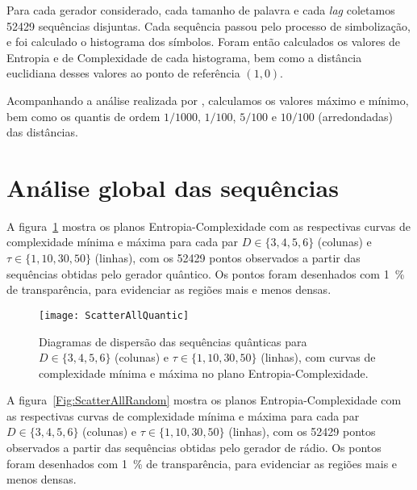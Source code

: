 

\begin{center}
\end{center}

Para cada gerador considerado, cada tamanho de palavra e cada \textit{lag} coletamos \num{52429} sequências disjuntas.
Cada sequência passou pelo processo de simbolização, e foi calculado o histograma dos símbolos.
Foram então calculados os valores de Entropia e de Complexidade de cada histograma, bem como a distância euclidiana desses valores ao ponto de referência $(1,0)$.

Acompanhando a análise realizada por \citet{NewPermutationEntropy}, calculamos os valores máximo e mínimo, bem como os quantis de ordem $1/1000$, $1/100$, $5/100$ e $10/100$ (arredondadas) das distâncias.

\section{Análise global das sequências}

A figura~\ref{Fig:ScatterAllQuantic} mostra os planos Entropia-Complexidade com as respectivas curvas de complexidade mínima e máxima para cada par $D\in\{3,4,5,6\}$ (colunas) e $\tau\in\{1,10,30,50\}$ (linhas), com os \num{52429} pontos observados a partir das sequências obtidas pelo gerador quântico.
Os pontos foram desenhados com \SI{1}{\percent} de transparência, para evidenciar as regiões mais e menos densas.

\begin{figure}[hbt]
\centering
\texttt{[image: ScatterAllQuantic]}
\caption{Diagramas de dispersão das sequências quânticas para $D\in\{3,4,5,6\}$ (colunas) e $\tau\in\{1,10,30,50\}$ (linhas), com curvas de complexidade mínima e máxima no plano Entropia-Complexidade.}\label{Fig:ScatterAllQuantic}
\end{figure}

A figura~\ref{Fig:ScatterAllRandom} mostra os planos Entropia-Complexidade com as respectivas curvas de complexidade mínima e máxima para cada par $D\in\{3,4,5,6\}$ (colunas) e $\tau\in\{1,10,30,50\}$ (linhas), com os \num{52429} pontos observados a partir das sequências obtidas pelo gerador de rádio.
Os pontos foram desenhados com \SI{1}{\percent} de transparência, para evidenciar as regiões mais e menos densas.

